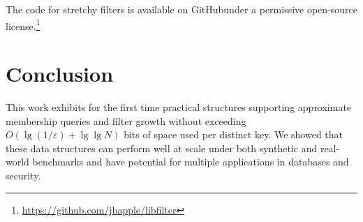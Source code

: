 \documentclass[letterpaper,twocolumn,10pt]{article}
\newcommand{\etal}{et al.}
\newcommand{\taffy}{stretchy}
\newcommand{\TCF}{SCF}
\newcommand{\MTCF}{MSCF}
\newcommand{\taffy}{taffy}
\newcommand{\TCF}{TCF}
\newcommand{\MTCF}{MTCF}
\begin{document}
\ifanon
\else
The code for \taffy{} filters is available \ifanon\else on GitHub\fi under a permissive open-source license.\ifanon\else\footnote{\url{https://github.com/jbapple/libfilter}}\fi
\fi








\section{Conclusion}
\label{conclusion}

This work exhibits for the first time practical structures supporting approximate membership queries and filter growth without exceeding $O(\lg (1/\varepsilon) + \lg \lg N)$ bits of space used per distinct key.
We showed that these data structures can perform well at scale under both synthetic and real-world benchmarks and have potential for multiple applications in databases and security.




\end{document}
